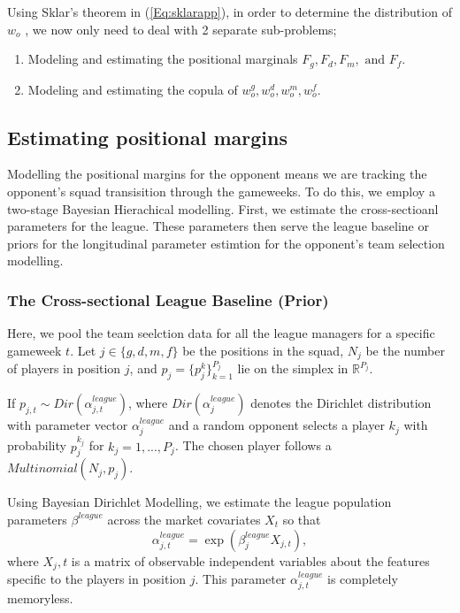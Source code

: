 \documentclass[12pt,oneside,a4paper]{book}
\theoremstyle{definition}
\theoremstyle{remark}
\begin{document}
			Using Sklar's theorem in (\ref{Eq:sklarapp}), in order to determine the distribution of $w_o$ , we now only need to deal with 2 separate sub-problems;
				\begin{enumerate}
					\item[(i).] Modeling and estimating the positional marginals $F_g, F_d, F_m, \text{ and }F_f.$
					\item[(ii).] Modeling and estimating the copula of $w_o^g,w_o^d,w_o^m,w_o^f$.
				\end{enumerate}

			\subsection{Estimating positional margins} \label{sec:positional_margins}
				Modelling the positional margins for the opponent means we are tracking the opponent's squad transisition through the gameweeks. To do this, we employ a two-stage Bayesian Hierachical modelling.
				First, we estimate the cross-sectioanl parameters for the league. These parameters then serve the league baseline or priors for the longitudinal parameter estimtion for the opponent's team selection modelling.

				\subsubsection{The Cross-sectional League Baseline (Prior)}
				Here, we pool the team seelction data for all the league managers for a specific gameweek $t$. Let $j \in \{g,d,m,f\}$ be the positions in the squad, $N_j$ be the number of players in position $j$, and $p_j = \{p_j^k\}_{k=1}^{P_j}$ lie on the simplex in $\mathbb{R}^{P_j}$.

				If $p_{j,t} \sim Dir(\alpha^{league}_{j,t})$, where $Dir (\alpha^{league}_j)$ denotes the Dirichlet distribution with parameter vector $\alpha^{league}_j$ and a random opponent selects a player $k_j$ with probability $p_j^{k_j}$ for $k_j = 1, ..., P_j$. The chosen player follows a $Multinomial(N_j, p_j)$.

				Using Bayesian Dirichlet Modelling, we estimate the league population parameters $\beta^{league}$ across the market covariates  $X_t$ so that
				\begin{equation}\label{eq:alpha_league}
					\alpha_{j,t}^{league} = \exp\left(\beta_{j}^{league} X_{j,t} \right),
				\end{equation}
				where $X_j,t$ is a matrix of observable independent variables about the features specific to the players in position $j$.
				This parameter $\alpha_{j,t}^{league}$ is completely memoryless.
\end{document}
